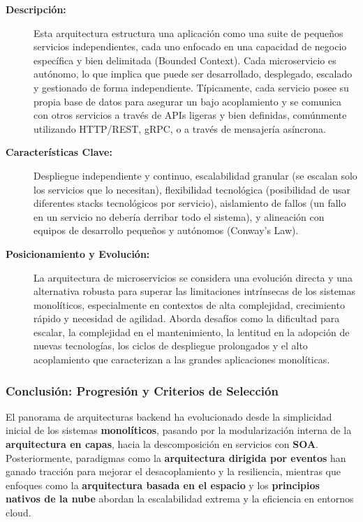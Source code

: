 \begin{description}
    \item[\textbf{Descripción:}] Esta arquitectura estructura una aplicación como una suite de pequeños servicios independientes, cada uno enfocado en una capacidad de negocio específica y bien delimitada (Bounded Context). Cada microservicio es autónomo, lo que implica que puede ser desarrollado, desplegado, escalado y gestionado de forma independiente. Típicamente, cada servicio posee su propia base de datos para asegurar un bajo acoplamiento y se comunica con otros servicios a través de APIs ligeras y bien definidas, comúnmente utilizando HTTP/REST, gRPC, o a través de mensajería asíncrona.
    \item[\textbf{Características Clave:}] Despliegue independiente y continuo, escalabilidad granular (se escalan solo los servicios que lo necesitan), flexibilidad tecnológica (posibilidad de usar diferentes stacks tecnológicos por servicio), aislamiento de fallos (un fallo en un servicio no debería derribar todo el sistema), y alineación con equipos de desarrollo pequeños y autónomos (Conway's Law).
    \item[\textbf{Posicionamiento y Evolución:}] La arquitectura de microservicios se considera una evolución directa y una alternativa robusta para superar las limitaciones intrínsecas de los sistemas monolíticos, especialmente en contextos de alta complejidad, crecimiento rápido y necesidad de agilidad. Aborda desafíos como la dificultad para escalar, la complejidad en el mantenimiento, la lentitud en la adopción de nuevas tecnologías, los ciclos de despliegue prolongados y el alto acoplamiento que caracterizan a las grandes aplicaciones monolíticas.
\end{description}

\subsubsection*{Conclusión: Progresión y Criterios de Selección}

El panorama de arquitecturas backend ha evolucionado desde la simplicidad inicial de los sistemas \textbf{monolíticos}, pasando por la modularización interna de la \textbf{arquitectura en capas}, hacia la descomposición en servicios con \textbf{SOA}. Posteriormente, paradigmas como la \textbf{arquitectura dirigida por eventos} han ganado tracción para mejorar el desacoplamiento y la resiliencia, mientras que enfoques como la \textbf{arquitectura basada en el espacio} y los \textbf{principios nativos de la nube} abordan la escalabilidad extrema y la eficiencia en entornos cloud.

